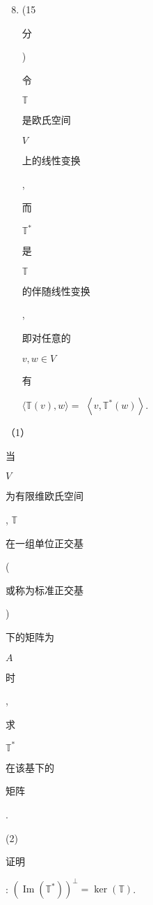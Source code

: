 \documentclass[10pt]{article}
\begin{document}
\begin{enumerate}
  \setcounter{enumi}{7}
  \item (15\begin{CJK}{UTF8}{mj}分\end{CJK}) \begin{CJK}{UTF8}{mj}令\end{CJK} $\mathbb{T}$ \begin{CJK}{UTF8}{mj}是欧氏空间\end{CJK} $V$ \begin{CJK}{UTF8}{mj}上的线性变换\end{CJK}, \begin{CJK}{UTF8}{mj}而\end{CJK} $\mathbb{T}^{*}$ \begin{CJK}{UTF8}{mj}是\end{CJK} $\mathbb{T}$ \begin{CJK}{UTF8}{mj}的伴随线性变换\end{CJK}, \begin{CJK}{UTF8}{mj}即对任意的\end{CJK} $v, w \in V$ \begin{CJK}{UTF8}{mj}有\end{CJK} $\langle\mathbb{T}(v), w\rangle=$ $\left\langle v, \mathbb{T}^{*}(w)\right\rangle$.
\end{enumerate}
（1）\begin{CJK}{UTF8}{mj}当\end{CJK} $V$ \begin{CJK}{UTF8}{mj}为有限维欧氏空间\end{CJK}, $\mathbb{T}$ \begin{CJK}{UTF8}{mj}在一组单位正交基\end{CJK}(\begin{CJK}{UTF8}{mj}或称为标准正交基\end{CJK})\begin{CJK}{UTF8}{mj}下的矩阵为\end{CJK} $A$ \begin{CJK}{UTF8}{mj}时\end{CJK}, \begin{CJK}{UTF8}{mj}求\end{CJK} $\mathbb{T}^{*}$ \begin{CJK}{UTF8}{mj}在该基下的\end{CJK} \begin{CJK}{UTF8}{mj}矩阵\end{CJK}.

(2) \begin{CJK}{UTF8}{mj}证明\end{CJK}: $\left(\operatorname{Im}\left(\mathbb{T}^{*}\right)\right)^{\perp}=\operatorname{ker}(\mathbb{T})$.
\end{document}
